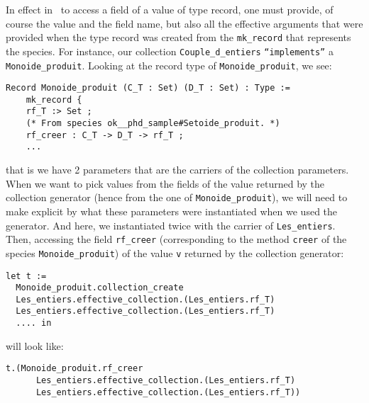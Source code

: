 In effect in \coq\, to access a field of a value of type record, one
must provide, of course the value and the field name, but also all the
effective arguments that were provided when the type record was
created from the {\tt mk\_record} that represents the species.
For instance, our collection {\tt Couple\_d\_entiers}
{\tt ``implements''} a {\tt Monoide\_produit}. Looking at the record
type of {\tt Monoide\_produit}, we see:
{\footnotesize
\begin{lstlisting}[language=MyCoq]
  Record Monoide_produit (C_T : Set) (D_T : Set) : Type :=
    mk_record {
    rf_T :> Set ;
    (* From species ok__phd_sample#Setoide_produit. *)
    rf_creer : C_T -> D_T -> rf_T ;
    ...
\end{lstlisting}
}
that is we have 2 parameters that are the carriers of the collection
parameters. When we want to pick values from the fields of the value
returned by the collection generator (hence from the one of
{\tt Monoide\_produit}), we will need to make explicit by what these
parameters were instantiated when we used the generator. And here, we
instantiated twice with the carrier of {\tt Les\_entiers}.
Then, accessing the field {\tt rf\_creer} (corresponding to the method
{\tt creer} of the species {\tt Monoide\_produit}) of the value
{\tt v} returned by the collection generator:
{\footnotesize
\begin{lstlisting}[language=MyCoq]
let t :=
  Monoide_produit.collection_create
  Les_entiers.effective_collection.(Les_entiers.rf_T)
  Les_entiers.effective_collection.(Les_entiers.rf_T)
  .... in
\end{lstlisting}
}
will look like:
{\footnotesize
\begin{lstlisting}[language=MyCoq]
 t.(Monoide_produit.rf_creer
      Les_entiers.effective_collection.(Les_entiers.rf_T)
      Les_entiers.effective_collection.(Les_entiers.rf_T))
\end{lstlisting}
}

